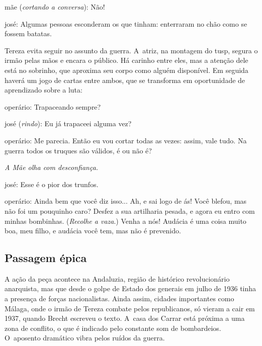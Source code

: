 {\sc mãe} ({\it cortando a conversa}): Não!

{\sc josé}: Algumas pessoas esconderam os que tinham: enterraram no chão como
se fossem batatas.
\stopblockquote

Tereza evita seguir no assunto da guerra. A~atriz, na montagem do {\sc tusp},
segura o irmão pelas mãos e encara o público. Há carinho entre eles, mas
a atenção dele está no sobrinho, que aproxima seu corpo como alguém
disponível. Em seguida haverá um jogo de cartas entre ambos, que se
transforma em oportunidade de aprendizado sobre a luta:

\startblockquote
{\sc operário}: Trapaceando sempre?

{\sc josé} ({\it rindo}): Eu já trapaceei alguma vez?

{\sc operário}: Me parecia. Então eu vou cortar todas as vezes: assim, vale
tudo. Na guerra todos os truques são válidos, é ou não é?

{\it A Mãe olha com desconfiança.}

{\sc josé}: Esse é o pior dos trunfos.

{\sc operário}: Ainda bem que você diz isso... Ah, e sai logo de ás! Você
blefou, mas não foi um pouquinho caro? Desfez a sua artilharia pesada, e
agora eu entro com minhas bombinhas. ({\it Recolhe a vaza}.) Venha a
nós! Audácia é uma coisa muito boa, meu filho, e audácia você tem, mas
não é prevenido.
\stopblockquote


\subsection{Passagem épica}

A ação da peça acontece na Andaluzia, região de histórico revolucionário
anarquista, mas que desde o golpe de Estado dos generais em julho de
1936 tinha a presença de forças nacionalistas. Ainda assim, cidades
importantes como Málaga, onde o irmão de Tereza combate pelos
republicanos, só vieram a cair em 1937, quando Brecht escreveu o
texto. A~casa dos Carrar está próxima a uma zona de conflito, o que é
indicado pelo constante som de bombardeios. O~aposento dramático vibra
pelos ruídos da guerra.

